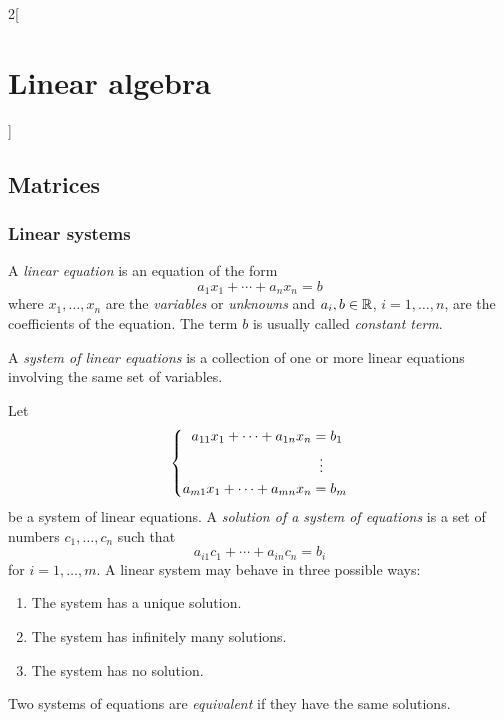 \documentclass[../../../main_math.tex]{subfiles}
\begin{document}
\begin{multicols}{2}[\section{Linear algebra}]
  \subsection{Matrices}
  \subsubsection{Linear systems}
  \begin{definition}
    A \emph{linear equation} is an equation of the form $$a_1x_1+\cdots+a_nx_n=b$$ where $x_1,\ldots,x_n$ are the \emph{variables} or \emph{unknowns} and $a_i,b\in\mathbb{R}$, $i=1,\ldots,n$, are the coefficients of the equation. The term $b$ is usually called \emph{constant term}.
  \end{definition}
  \begin{definition}
    A \emph{system of linear equations} is a collection of one or more linear equations involving the same set of variables.
  \end{definition}
  \begin{definition}
    Let
    \begin{equation*}
      \arraycolsep=1pt
      \left\{
      \begin{aligned}
        a_{11}x_1  + \cdots +  a_{1n}x_n & =  b_1     \\
                                         & \;\;\vdots \\
        a_{m1}x_1  + \cdots +  a_{mn}x_n & =  b_m
      \end{aligned}
      \right.
    \end{equation*}
    be a system of linear equations. A \emph{solution of a system of equations} is a set of numbers $c_1,\ldots,c_n$ such that $$a_{i1}c_1+\cdots+a_{in}c_n=b_i$$ for $i=1,\ldots,m$. A linear system may behave in three possible ways:
    \begin{enumerate}
      \item The system has a unique solution.
      \item The system has infinitely many solutions.
      \item The system has no solution.
    \end{enumerate}
  \end{definition}
  \begin{definition}
    Two systems of equations are \emph{equivalent} if they have the same solutions.
  \end{definition}

\end{multicols}
\end{document}
